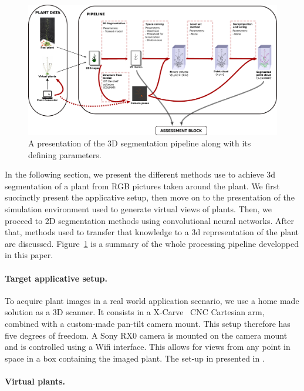 \begin{figure}[h!]
    \centering \includegraphics[width = \linewidth]{figures/pipeline.pdf}
    \caption{A presentation of the 3D segmentation pipeline along with its
defining parameters.} \label{fig:pipe}
\end{figure}
In the following section, we present the different methods use to achieve 3d
segmentation of a plant from RGB pictures taken around the plant. We first
succinctly present the applicative setup, then move on to the presentation of
the simulation environment used to generate virtual views of plants. Then, we
proceed to 2D segmentation methods using convolutional neural networks. After
that, methods used to transfer that knowledge to a 3d representation of the
plant are discussed. Figure~\ref{fig:pipe} is a summary of the whole processing
pipeline developped in this paper.

\paragraph{Target applicative setup.}
To acquire plant images in a real world application scenario, we use a home made solution as a 3D
scanner. It consists in a X-Carve~\cite{xcarve} CNC Cartesian arm, combined with a
custom-made pan-tilt camera mount. This setup therefore has five degrees of freedom.
A Sony RX0 camera  is mounted on the camera mount and is controlled using a Wifi interface. This allows for views from any point in space in a box containing
the imaged plant. The set-up in presented in \cite{wintz2018automated}.

\paragraph{Virtual plants.}

